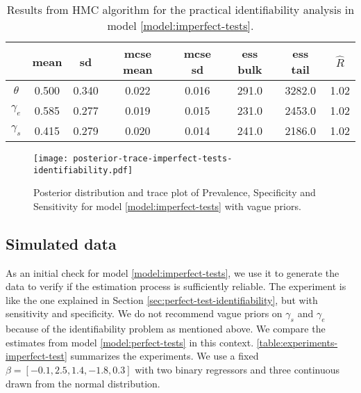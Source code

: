 \begin{table}[tbp]
  \centering
  \caption{\label{tab:results-identifiability-imperfect-tests}Results from HMC
  algorithm for the practical identifiability analysis in model \eqref{model:imperfect-tests}.}
  \begin{tabular}{cccccccc}
    \hline
    \textbf{} & \textbf{mean} & \textbf{sd} & \textbf{mcse mean} &
    \textbf{mcse sd} & \textbf{ess bulk} & \textbf{ess tail} &
    \textbf{$\hat{R}$} \\ \hline
    $\theta$ & 0.500 & 0.340 & 0.022 & 0.016 & 291.0 & 3282.0 & 1.02 \\
    $\gamma_e$ & 0.585 & 0.277 & 0.019 & 0.015 & 231.0 & 2453.0 & 1.02 \\
    $\gamma_s$ & 0.415 & 0.279 & 0.020 & 0.014 & 241.0 & 2186.0 & 1.02 \\ \hline
  \end{tabular}
\end{table}

\begin{figure}[ht]
  \centering
  \caption{\label{fig:posterior-trace-imperfect-tests-identifiability}Posterior
  distribution and trace plot of Prevalence, Specificity and Sensitivity for
  model \eqref{model:imperfect-tests} with vague priors.}
  \texttt{[image: posterior-trace-imperfect-tests-identifiability.pdf]}
\end{figure}

\subsection{Simulated data}

As an initial check for model \eqref{model:imperfect-tests}, we use it to
generate the data to verify if the estimation process is sufficiently
reliable. The experiment is like the one explained in Section
\ref{sec:perfect-test-identifiability}, but with sensitivity and specificity.
We do not recommend vague priors on $\gamma_s$ and $\gamma_e$ because of the
identifiability
problem as mentioned above. We compare the estimates from model
\eqref{model:perfect-tests} in this context. \autoref{table:experiments-imperfect-test} summarizes the
experiments. We use a fixed $\beta = [-0.1, 2.5, 1.4, -1.8, 0.3]$ with
two binary regressors and three continuous drawn from the normal distribution.

